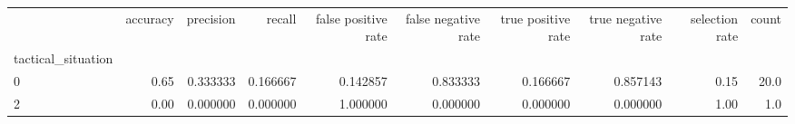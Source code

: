 \begin{tabular}{lrrrrrrrrr}
\toprule
{} &  accuracy &  precision &    recall &  false positive rate &  false negative rate &  true positive rate &  true negative rate &  selection rate &  count \\
tactical\_situation &           &            &           &                      &                      &                     &                     &                 &        \\
\midrule
0                  &      0.65 &   0.333333 &  0.166667 &             0.142857 &             0.833333 &            0.166667 &            0.857143 &            0.15 &   20.0 \\
2                  &      0.00 &   0.000000 &  0.000000 &             1.000000 &             0.000000 &            0.000000 &            0.000000 &            1.00 &    1.0 \\
\bottomrule
\end{tabular}
